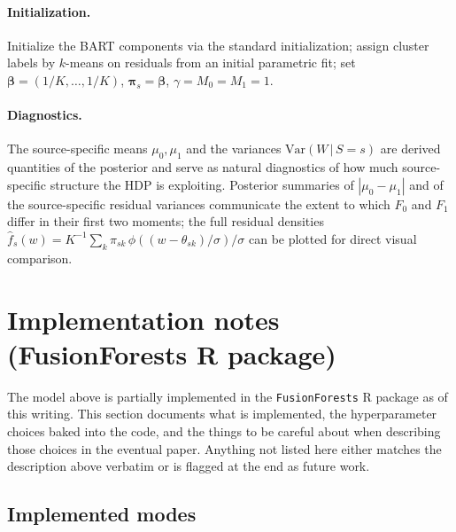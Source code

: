\documentclass[11pt]{article}
\newcommand{\given}{\,|\,}
\newcommand{\Var}{\mathrm{Var}}
\newcommand{\1}{\mathbf{1}}
\begin{document}
\paragraph{Initialization.} Initialize the BART components via the standard \citet{chipman2010bart} initialization; assign cluster labels by $k$-means on residuals from an initial parametric fit; set $\bm{\beta} = (1/K, \ldots, 1/K)$, $\bm{\pi}_s = \bm{\beta}$, $\gamma = M_0 = M_1 = 1$.

\paragraph{Diagnostics.} The source-specific means $\mu_0, \mu_1$ and the variances $\Var(W \given S = s)$ are derived quantities of the posterior and serve as natural diagnostics of how much source-specific structure the HDP is exploiting. Posterior summaries of $|\mu_0 - \mu_1|$ and of the source-specific residual variances communicate the extent to which $F_0$ and $F_1$ differ in their first two moments; the full residual densities $\hat f_s(w) = K^{-1} \sum_k \pi_{sk}\, \phi((w - \theta_{sk})/\sigma)/\sigma$ can be plotted for direct visual comparison.

\section{Implementation notes (FusionForests R package)}\label{sec:implementation}

The model above is partially implemented in the \texttt{FusionForests} R package as of this writing. This section documents what is implemented, the hyperparameter choices baked into the code, and the things to be careful about when describing those choices in the eventual paper. Anything not listed here either matches the description above verbatim or is flagged at the end as future work.

\subsection{Implemented modes}
\end{document}
